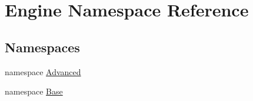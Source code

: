 \hypertarget{namespace_engine}{}\section{Engine Namespace Reference}
\label{namespace_engine}
\subsection*{Namespaces}
\begin{DoxyCompactItemize}
\item 
namespace \mbox{\hyperlink{namespace_engine_1_1_advanced}{Advanced}}
\item 
namespace \mbox{\hyperlink{namespace_engine_1_1_base}{Base}}
\end{DoxyCompactItemize}
